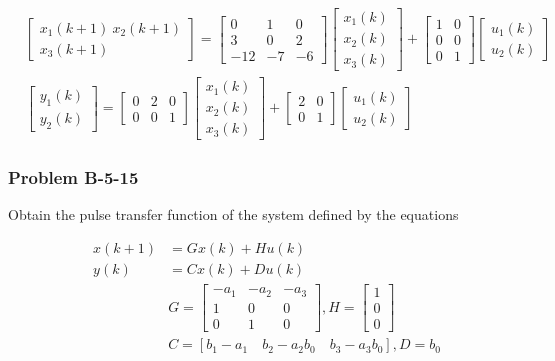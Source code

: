 \begin{align*}
& \begin{bmatrix}
x_1(k+1) \
x_2(k+1) \\
x_3(k+1)
\end{bmatrix} = \begin{bmatrix}
0   &  1 & 0 \\
3   &  0 & 2 \\
-12 & -7 & -6
\end{bmatrix}\begin{bmatrix}
x_1(k) \\
x_2(k) \\
x_3(k)
\end{bmatrix}+\begin{bmatrix}
1   &  0 \\
0   &  0 \\
0   &  1
\end{bmatrix}\begin{bmatrix}
u_1(k)  \\  u_2(k)
\end{bmatrix} \\
& \begin{bmatrix}
y_1(k) \\ y_2(k)
\end{bmatrix} =\begin{bmatrix}
0   &  2  & 0 \\
0   &  0  & 1
\end{bmatrix}\begin{bmatrix}
x_1(k) \\
x_2(k) \\
x_3(k)
\end{bmatrix}+
\begin{bmatrix}
2 & 0 \\
0 & 1
\end{bmatrix}\begin{bmatrix}
u_1(k) \\
u_2(k)
\end{bmatrix}
\end{align*}
\subsubsection*{Problem B-5-15}
Obtain the pulse transfer function of the system defined by the equations

\begin{align*}
\quad x(k+1) & = Gx(k)+Hu(k) \\
\quad y(k)   & = Cx(k)+Du(k) \\
 & G = \begin{bmatrix}
-a_1 & -a_2 & -a_3 \\
1    &  0   &   0  \\
0    &  1   &   0
\end{bmatrix}, H = \begin{bmatrix}
1 \\ 0 \\ 0
\end{bmatrix} \\
& C = [b_1-a_1 \quad   b_2 - a_2b_0 \quad  b_3 - a_3b_0], D= b_0
\end{align*}


